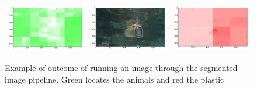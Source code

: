 \begin{figure}[h!tb]
\begin{minipage}{1.3\textwidth}
\begin{tabular}{ccc}
\includegraphics[keepaspectratio=true,width=\segwidth]{images/segment/20607_01__animals__.png} &
\includegraphics[keepaspectratio=true,width=\segwidth]{images/segment/20607_01__image__.png} &
\includegraphics[keepaspectratio=true,width=\segwidth]{images/segment/20607_01__plastic__.png}
	\end{tabular}
\end{minipage}
\fi
\caption{Example of outcome of running an image through the segmented image pipeline. Green locates the animals and red the plastic}
\label{fig:sub-matrix}
\end{figure}